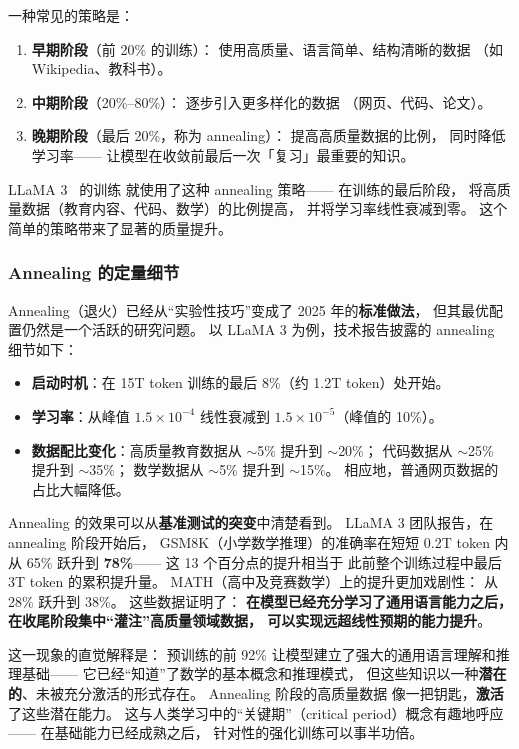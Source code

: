 一种常见的策略是：
\begin{enumerate}[noitemsep]
  \item \textbf{早期阶段}（前 20\% 的训练）：
        使用高质量、语言简单、结构清晰的数据
        （如 Wikipedia、教科书）。
  \item \textbf{中期阶段}（20\%--80\%）：
        逐步引入更多样化的数据
        （网页、代码、论文）。
  \item \textbf{晚期阶段}（最后 20\%，称为 annealing）：
        提高高质量数据的比例，
        同时降低学习率——
        让模型在收敛前最后一次「复习」最重要的知识。
\end{enumerate}

LLaMA 3~\cite{dubey2024llama3} 的训练
就使用了这种 annealing 策略——
在训练的最后阶段，
将高质量数据（教育内容、代码、数学）的比例提高，
并将学习率线性衰减到零。
这个简单的策略带来了显著的质量提升。

\subsubsection{Annealing 的定量细节}

Annealing（退火）已经从``实验性技巧''变成了
2025 年的\textbf{标准做法}，
但其最优配置仍然是一个活跃的研究问题。
以 LLaMA 3 为例，技术报告披露的 annealing 细节如下：
\begin{itemize}[noitemsep]
  \item \textbf{启动时机}：在 15T token 训练的最后 8\%（约 1.2T token）处开始。
  \item \textbf{学习率}：从峰值 $1.5 \times 10^{-4}$
        线性衰减到 $1.5 \times 10^{-5}$（峰值的 10\%）。
  \item \textbf{数据配比变化}：高质量教育数据从 $\sim$5\% 提升到 $\sim$20\%；
        代码数据从 $\sim$25\% 提升到 $\sim$35\%；
        数学数据从 $\sim$5\% 提升到 $\sim$15\%。
        相应地，普通网页数据的占比大幅降低。
\end{itemize}

Annealing 的效果可以从\textbf{基准测试的突变}中清楚看到。
LLaMA 3 团队报告，在 annealing 阶段开始后，
GSM8K（小学数学推理）的准确率在短短 0.2T token 内
从 65\% 跃升到 \textbf{78\%}——
这 13 个百分点的提升相当于
此前整个训练过程中最后 3T token 的累积提升量。
MATH（高中及竞赛数学）上的提升更加戏剧性：
从 28\% 跃升到 38\%。
这些数据证明了：
\textbf{在模型已经充分学习了通用语言能力之后，
在收尾阶段集中``灌注''高质量领域数据，
可以实现远超线性预期的能力提升}。

这一现象的直觉解释是：
预训练的前 92\% 让模型建立了强大的通用语言理解和推理基础——
它已经``知道''了数学的基本概念和推理模式，
但这些知识以一种\textbf{潜在的}、未被充分激活的形式存在。
Annealing 阶段的高质量数据
像一把钥匙，\textbf{激活}了这些潜在能力。
这与人类学习中的``关键期''（critical period）概念有趣地呼应——
在基础能力已经成熟之后，
针对性的强化训练可以事半功倍。

